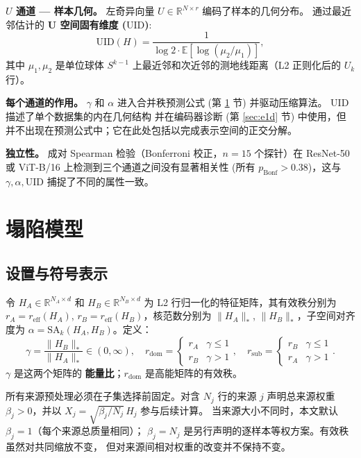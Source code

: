 \documentclass{article}
\newcommand{\reff}{\ensuremath{r_{\mathrm{eff}}}\xspace}
\newcommand{\SAk}{\ensuremath{\mathrm{SA}_k}\xspace}
\newcommand{\R}{\ensuremath{\mathbb{R}}}
\newcommand{\UID}{\ensuremath{\mathrm{UID}}\xspace}
\begin{document}
\textbf{$U$ 通道 --- 样本几何。}
左奇异向量 $U\in\R^{N\times r}$ 编码了样本的几何分布。
通过最近邻估计的 \textbf{U 空间固有维度 (\UID)}:
\begin{equation}
  \mathrm{UID}(H) = \frac{1}{\log 2\cdot\mathbb{E}[\log(\mu_2/\mu_1)]},
  \label{eq:uid}
\end{equation}
其中 $\mu_1,\mu_2$ 是单位球体 $S^{k-1}$ 上最近邻和次近邻的测地线距离（L2 正则化后的 $U_k$ 行）。

\textbf{每个通道的作用。}
$\gamma$ 和 $\alpha$ 进入合并秩预测公式
(第 \ref{sec:method} 节) 并驱动压缩算法。
\UID 描述了单个数据集的内在几何结构
并在编码器诊断 (第 \ref{sec:e1d} 节) 中使用，但
并不出现在预测公式中；它在此处包括以完成表示空间的正交分解。

\textbf{独立性。}
成对 Spearman 检验（Bonferroni 校正，$n{=}15$ 个探针）在 ResNet-50 或
ViT-B/16 上检测到三个通道之间没有显著相关性 (所有 $p_{\mathrm{Bonf}}{>}0.38$)，这与
$\gamma,\alpha,\UID$ 捕捉了不同的属性一致。
\section{塌陷模型}
\label{sec:method}

\subsection{设置与符号表示}
\label{sec:setup}

令 $H_A\in\R^{N_A\times d}$ 和 $H_B\in\R^{N_B\times d}$ 为 L2 行归一化的特征矩阵，其有效秩分别为 $r_A=\reff(H_A)$, $r_B=\reff(H_B)$，核范数分别为 $\|H_A\|_*$, $\|H_B\|_*$，子空间对齐度为 $\alpha=\SAk(H_A,H_B)$。定义：
\begin{equation}
  \gamma = \frac{\|H_B\|_*}{\|H_A\|_*} \in (0,\infty),
  \quad
  r_{\mathrm{dom}} = \begin{cases}r_A & \gamma\leq1 \\ r_B & \gamma>1\end{cases},
  \quad
  r_{\mathrm{sub}} = \begin{cases}r_B & \gamma\leq1 \\ r_A & \gamma>1\end{cases}.
\end{equation}
$\gamma$ 是这两个矩阵的 \textbf{能量比}；$r_{\mathrm{dom}}$ 是高能矩阵的有效秩。

所有来源预处理必须在子集选择前固定。对含 $N_j$ 行的来源 $j$ 声明总来源权重
$\beta_j>0$，并以 $X_j=\sqrt{\beta_j/N_j}\,H_j$ 参与后续计算。
当来源大小不同时，本文默认 $\beta_j=1$（每个来源总质量相同）；
$\beta_j=N_j$ 是另行声明的逐样本等权方案。有效秩虽然对共同缩放不变，
但对来源间相对权重的改变并不保持不变。
\end{document}
